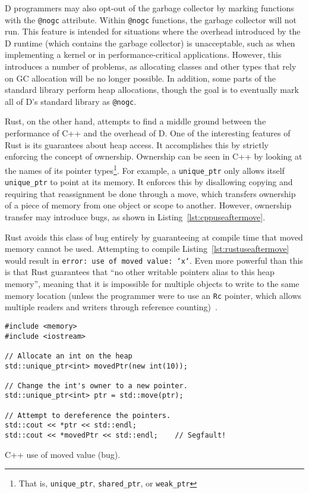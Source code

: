 \documentclass[draftcopy,nolof,nolot]{srpaper}
\begin{document}
D programmers may also opt-out of the garbage collector by marking functions
with the \texttt{@nogc} attribute. Within \texttt{@nogc} functions, the garbage
collector will not run. This feature is intended for situations where the
overhead introduced by the D runtime (which contains the garbage collector) is
unacceptable, such as when implementing a kernel or in performance-critical
applications. However, this introduces a number of problems, as allocating
classes and other types that rely on GC allocation will be no longer possible.
In addition, some parts of the standard library perform heap allocations,
though the goal is to eventually mark all of D's standard library as
\texttt{@nogc}.

Rust, on the other hand, attempts to find a middle ground between the
performance of C++ and the overhead of D. One of the interesting features of
Rust is its guarantees about heap access. It accomplishes this by strictly
enforcing the concept of ownership. Ownership can be seen in C++ by looking at
the names of its pointer types\footnote{That is, \texttt{unique\_ptr},
\texttt{shared\_ptr}, or \texttt{weak\_ptr}}. For example, a
\texttt{unique\_ptr} only allows itself \texttt{unique\_ptr} to point at its
memory. It enforces this by disallowing copying and requiring that reassignment
be done through a move, which transfers ownership of a piece of memory from one
object or scope to another. However, ownership transfer may introduce bugs, as
shown in Listing~\ref{lst:cppuseaftermove}.

Rust avoids this class of bug entirely by guaranteeing at compile time that
moved memory cannot be used. Attempting to compile
Listing~\ref{lst:rustuseaftermove} would result in \texttt{error: use of moved
value: `x`}. Even more powerful than this is that Rust guarantees that ``no
other writable pointers alias to this heap memory'', meaning that it is
impossible for multiple objects to write to the same memory location (unless
the programmer were to use an \texttt{Rc} pointer, which allows multiple
readers and writers through reference counting)~\cite{RustPointerGuide}.

\begin{listing}[h]
\begin{verbatim}
#include <memory>
#include <iostream>

// Allocate an int on the heap
std::unique_ptr<int> movedPtr(new int(10));

// Change the int's owner to a new pointer.
std::unique_ptr<int> ptr = std::move(ptr);

// Attempt to dereference the pointers.
std::cout << *ptr << std::endl;
std::cout << *movedPtr << std::endl;    // Segfault!
\end{verbatim}
\caption{C++ use of moved value (bug).}
\label{lst:cppuseaftermove}
\end{listing}
\end{document}
